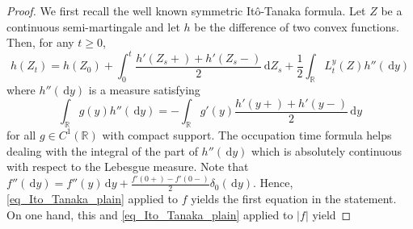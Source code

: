 \documentclass[12pt]{article}
\numberwithin{equation}{section}
\theoremstyle{definition}
\theoremstyle{remark}
\newcommand{\RR}{\mathbb{R}}
\newcommand{\vd}{\,\mathrm{d}}
\DeclareMathOperator{\sgn}{sgn}
\begin{document}
\begin{proof}
We first recall the well known symmetric It\^o-Tanaka formula. 
Let $ Z $ be a continuous semi-martingale and let $h$ be the difference of two convex functions.
Then, for any $t\ge 0 $,
		\begin{equation}\label{eq_Ito_Tanaka_plain}
			h(Z_t) = h(Z_0) + \int_{0}^{t} \frac{h'(Z_s+)+h'(Z_s-)}2 \vd Z_s + \frac{1}{2} 
			\int_{\mathbb R} L^y_t(Z) h''(\!\vd y)
		\end{equation}
where 
$h''(\!\vd y)$ is a measure satisfying 
\[
		\int_\RR g(y) h''(\!\vd y) = - \int_\RR g'(y) \frac{h'(y+) + h'(y-)}2 \vd y
\]
for all $g\in C^1(\mathbb{R})$ with compact support.
The occupation time formula helps dealing with the integral of the part of $h''(\!\vd y)$ which is absolutely continuous with respect to the Lebesgue measure. 
%
Note that $f''(\! \vd y) = f''(y)\vd y + \frac{f'(0+) - f'(0-)}{2} \delta_{0}(\vd y)$.
Hence, \eqref{eq_Ito_Tanaka_plain} applied to $f$ yields 
the first equation in the statement.
On one hand, this and \eqref{eq_Ito_Tanaka_plain} applied to $|f|$ yield

\end{proof}
\end{document}
